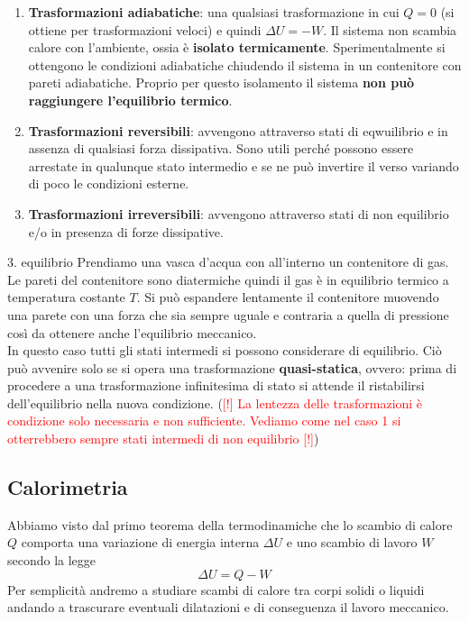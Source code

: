 \documentclass[x11names]{article}
\begin{document}
	
	\begin{enumerate}
		\item \textbf{Trasformazioni adiabatiche}: una qualsiasi trasformazione in cui \(Q = 0\) (si ottiene per trasformazioni veloci) e quindi \(\Delta U = - W\). Il sistema non scambia calore con l'ambiente, ossia è \textbf{isolato termicamente}. Sperimentalmente si ottengono le condizioni adiabatiche chiudendo il sistema in un contenitore con pareti adiabatiche. Proprio per questo isolamento il sistema \textbf{non può raggiungere l'equilibrio termico}.
		\item \textbf{Trasformazioni reversibili}: avvengono attraverso stati di eqwuilibrio e in assenza di qualsiasi forza dissipativa. Sono utili perché possono essere arrestate in qualunque stato intermedio e se ne può invertire il verso variando di poco le condizioni esterne.
		\item \textbf{Trasformazioni irreversibili}: avvengono attraverso stati di non equilibrio e/o in presenza di forze dissipative.
	\end{enumerate}
	
	\begin{es}{3. equilibrio}
		Prendiamo una vasca d'acqua con all'interno un contenitore di gas. Le pareti del contenitore sono diatermiche quindi il gas è in equilibrio termico a temperatura costante \(T\). Si può espandere lentamente il contenitore muovendo una parete con una forza che sia sempre uguale e contraria a quella di pressione così da ottenere anche l'equilibrio meccanico. \\
		
		In questo caso tutti gli stati intermedi si possono considerare di equilibrio. Ciò può avvenire solo se si opera una trasformazione \textbf{quasi-statica}, ovvero: prima di procedere a una trasformazione infinitesima di stato si attende il ristabilirsi dell'equilibrio nella nuova condizione.
		(\textcolor{red}{[!] La lentezza delle trasformazioni è condizione solo necessaria e non sufficiente. Vediamo come nel caso 1 si otterrebbero sempre stati intermedi di non equilibrio [!]})
	\end{es}
	
	
	\subsection{Calorimetria}
	Abbiamo visto dal primo teorema della termodinamiche che lo scambio di calore \(Q\) comporta una variazione di energia interna \(\Delta U\) e uno scambio di lavoro \(W\) secondo la legge
	\[ 
	\Delta U = Q -W
	\]
	Per semplicità andremo a studiare scambi di calore tra corpi solidi o liquidi andando a trascurare eventuali dilatazioni e di conseguenza il lavoro meccanico. \\
	
\end{document}
